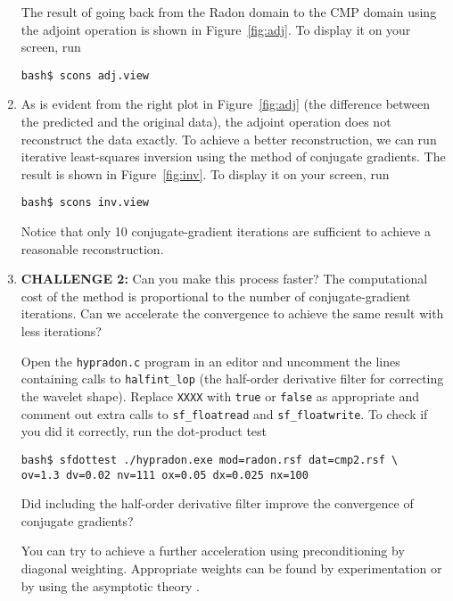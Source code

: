 \begin{enumerate}
The result of going back from the Radon domain to the CMP domain using the adjoint operation is shown in Figure~\ref{fig:adj}. To display it on your screen, run
\begin{verbatim}
bash$ scons adj.view
\end{verbatim}


\item As is evident from the right plot in Figure~\ref{fig:adj} (the difference between the predicted and the original data), the adjoint operation does not reconstruct the data exactly. To achieve a better reconstruction, we can run iterative least-squares inversion using the method of conjugate gradients. The result is shown in Figure~\ref{fig:inv}. To display it on your screen, run
\begin{verbatim}
bash$ scons inv.view
\end{verbatim}

Notice that only 10 conjugate-gradient iterations are sufficient to achieve a reasonable reconstruction.

\item \textbf{CHALLENGE 2:} Can you make this process faster? The computational cost of the method is proportional to the number of conjugate-gradient iterations. Can we accelerate the convergence to achieve the same result with less iterations?

Open the \texttt{hypradon.c} program in an editor and uncomment the lines containing calls to \texttt{halfint\_lop} (the half-order derivative filter for correcting the wavelet shape). Replace \texttt{XXXX} with \texttt{true} or \texttt{false} as appropriate and comment out extra calls to \texttt{sf\_floatread} and \texttt{sf\_floatwrite}. To check if you did it correctly, run the dot-product test
\begin{verbatim}
bash$ sfdottest ./hypradon.exe mod=radon.rsf dat=cmp2.rsf \
ov=1.3 dv=0.02 nv=111 ox=0.05 dx=0.025 nx=100
\end{verbatim}
Did including the half-order derivative filter improve the convergence of conjugate gradients? 

You can try to achieve  a further acceleration using preconditioning by diagonal weighting. Appropriate weights can be found by experimentation or by using the asymptotic theory \cite[]{GEO68-03-10321042}. 


\end{enumerate}
